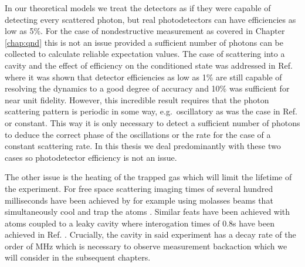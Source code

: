 In our theoretical models we treat the detectors as if they were
capable of detecting every scattered photon, but real photodetectors
can have efficiencies as low as 5\%. For the case of nondestructive
measurement as covered in Chapter \ref{chap:qnd} this is not an issue
provided a sufficient number of photons can be collected to calculate
reliable expectation values. The case of scattering into a cavity and
the effect of efficiency on the conditioned state was addressed in
Ref. \cite{mazzucchi2016njp} where it was shown that detector
efficiencies as low as 1\% are still capable of resolving the dynamics
to a good degree of accuracy and 10\% was sufficient for near unit
fidelity. However, this incredible result requires that the photon
scattering pattern is periodic in some way, e.g.~oscillatory as was
the case in Ref. \cite{mazzucchi2016njp} or constant. This way it is
only necessary to detect a sufficient number of photons to deduce the
correct phase of the oscillations or the rate for the case of a
constant scattering rate. In this thesis we deal predominantly with
these two cases so photodetector efficiency is not an issue.

The other issue is the heating of the trapped gas which will limit the
lifetime of the experiment. For free space scattering imaging times of
several hundred milliseconds have been achieved by for example using
molasses beams that simultaneously cool and trap the atoms
\cite{weitenberg2011, weitenbergThesis}. Similar feats have been
achieved with atoms coupled to a leaky cavity where interogation times
of 0.8s have been achieved in Ref. \cite{brennecke2013}. Crucially,
the cavity in said experiment has a decay rate of the order of MHz
which is necessary to observe measurement backaction which we will
consider in the subsequent chapters.
